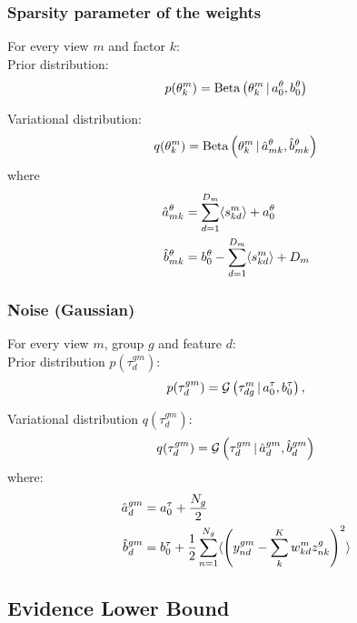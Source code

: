 \subsubsection*{Sparsity parameter of the weights}

For every view $m$ and factor $k$: \\

Prior distribution:
\[
	p(\theta_k^m) = \text{Beta}\left(\theta_k^m \,|\, a_0^\theta,b_0^\theta\right)
\]

Variational distribution:
\begin{equation}
	q(\theta_k^m) = \text{Beta}\left(\theta_k^m \,|\, \hat{a}_{mk}^{\theta}, \hat{b}_{mk}^{\theta}\right)
\end{equation}
where
\begin{equation}
     \begin{aligned}
  	\hat{a}_{mk}^\theta &= \sum_{d=1}^{D_m} \langle s^m_{kd}\rangle + a_0^\theta\\
  	\hat{b}_{mk}^\theta &= b_0^\theta - \sum_{d=1}^{D_m} \langle s^m_{kd}\rangle + D_m
     \end{aligned}
\end{equation}


\subsubsection*{Noise (Gaussian)}

For every view $m$, group $g$ and feature $d$:\\

Prior distribution $p(\tau_d^{gm})$:
\[
	p(\tau_d^{gm}) = \mathcal{G}\left(\tau_{dg}^m \,|\, a_0^\tau,b_0^\tau\right),
\]

Variational distribution $q(\tau_d^{gm})$:
\begin{equation}
	q(\tau_d^{gm}) = \mathcal{G}\left(\tau_d^{gm} \,|\, \hat{a}_{d}^{gm} , \hat{b}_{d}^{gm}\right)
\end{equation}
where:
\begin{equation} \begin{aligned}
	\hat{a}_{d}^{gm} &= a_0^{\tau} + \frac{N_g}{2}\\
	\hat{b}_{d}^{gm} &= b_0^{\tau} + \frac{1}{2} \sum_{n=1}^{N_g}  \langle\left(y_{nd}^{gm} - \sum_k^{K} w_{kd}^m z_{nk}^{g}\right)^2 \rangle
\end{aligned} \end{equation}


\subsection{Evidence Lower Bound}

